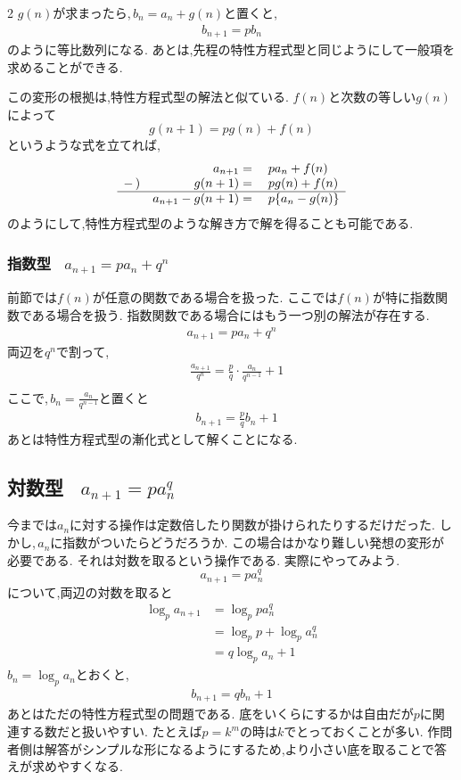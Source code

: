 \documentclass[dvipdfmx,a4paper,11pt,fleqn,openany]{jsbook}
\begin{document}
\begin{multicols*}{2}
      $g(n)$が求まったら,\,$b_n=a_n+g(n)$と置くと,
      \begin{align*}
        b_{n+1}=pb_n
      \end{align*}
      のように等比数列になる.
      あとは,先程の特性方程式型と同じようにして一般項を求めることができる.

      この変形の根拠は,特性方程式型の解法と似ている.
      $f(n)$と次数の等しい$g(n)$によって
      \[
        g(n+1)=pg(n)+f(n)
      \]
      というような式を立てれば,
      \[
        \begin{array}{rrl}
          & a_{n+1}={} & pa_n+f(n)\\
          -\,) & g(n+1)={} & pg(n)+f(n)\\ \hline
          & a_{n+1}-g(n+1)={} & p\{a_n-g(n)\}
        \end{array}
      \]
      のようにして,特性方程式型のような解き方で解を得ることも可能である.
    \subsubsection{指数型  \, $\displaystyle a_{n+1}=pa_n+q^n$}
      前節では$f(n)$が任意の関数である場合を扱った.
      ここでは$f(n)$が特に指数関数である場合を扱う.
      指数関数である場合にはもう一つ別の解法が存在する.
      \begin{align*}
        a_{n+1}=pa_n+q^n
      \end{align*}
      両辺を$q^n$で割って,
      \begin{align*}      
        &\frac{a_{n+1}}{q^n}=\frac{p}{q}\cdot\frac{a_n}{q^{n-1}}+1\\
      \end{align*}
      ここで,\,$b_n=\frac{a_n}{q^{n-1}}$と置くと
      \begin{align*}
        &b_{n+1}=\frac{p}{q}b_n+1
      \end{align*}
      あとは特性方程式型の漸化式として解くことになる.
  \subsection{対数型 \, $a_{n+1}=pa_n^q$}
    今までは$a_n$に対する操作は定数倍したり関数が掛けられたりするだけだった.
    しかし,\,$a_n$に指数がついたらどうだろうか.
    この場合はかなり難しい発想の変形が必要である.
    それは対数を取るという操作である.
    実際にやってみよう.
    \[
      a_{n+1}=pa_n^q
    \]
    について,両辺の対数を取ると
    \begin{align*}
      \log_p{a_{n+1}}&=\log_p{pa_n^q}\\
      &=\log_p{p}+\log_p{a_n^q}\\
      &=q\log_p{a_n}+1
    \end{align*}
    $b_n=\log_p{a_n}$とおくと,
    \begin{align*}
      b_{n+1}=qb_n+1
    \end{align*}
    あとはただの特性方程式型の問題である.
    底をいくらにするかは自由だが$p$に関連する数だと扱いやすい.
    たとえば$p=k^m$の時は$k$でとっておくことが多い.
    作問者側は解答がシンプルな形になるようにするため,より小さい底を取ることで答えが求めやすくなる.


\end{multicols*}
\end{document}
